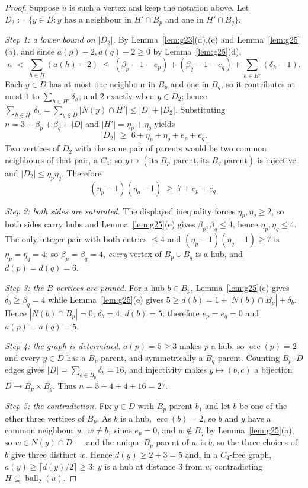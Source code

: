 \documentclass[11pt]{article}
\theoremstyle{plain}
\theoremstyle{definition}
\theoremstyle{remark}
\numberwithin{equation}{section}
\newcommand{\ecc}{\operatorname{ecc}}
\newcommand{\ball}{\operatorname{ball}}
\begin{document}
\begin{proof}
Suppose $u$ is such a vertex and keep the notation above. Let
$D_2 := \{y \in D : y$ has a neighbour in $H'\cap B_p$ and one in $H'\cap B_q\}$.

\emph{Step 1: a lower bound on $|D_2|$.} By Lemma~\ref{lem:g23}(d),(e) and
Lemma~\ref{lem:g25}(b), and since $a(p)-2, a(q)-2 \ge 0$ by Lemma~\ref{lem:g25}(d),
\[
 n \;<\; \sum_{h\in H}(a(h)-2)
   \;\le\; (\beta_p - 1 - e_p) + (\beta_q - 1 - e_q) + \sum_{h \in H'} (\delta_h - 1).
\]
Each $y \in D$ has at most one neighbour in $B_p$ and one in $B_q$, so it contributes at most
$1$ to $\sum_{h\in H'}\delta_h$, and $2$ exactly when $y \in D_2$; hence
$\sum_{h\in H'}\delta_h = \sum_{y\in D}|N(y)\cap H'| \le |D| + |D_2|$. Substituting
$n = 3+\beta_p+\beta_q+|D|$ and $|H'| = \eta_p + \eta_q$ yields
\[
  |D_2| \;\ge\; 6 + \eta_p + \eta_q + e_p + e_q .
\]
Two vertices of $D_2$ with the same pair of parents would be two common neighbours of that
pair, a $C_4$; so $y \mapsto (\text{its }B_p\text{-parent}, \text{its }B_q\text{-parent})$ is
injective and $|D_2| \le \eta_p\eta_q$. Therefore
\[
  (\eta_p - 1)(\eta_q - 1) \;\ge\; 7 + e_p + e_q .
\]

\emph{Step 2: both sides are saturated.} The displayed inequality forces
$\eta_p, \eta_q \ge 2$, so both sides carry hubs and Lemma~\ref{lem:g25}(e) gives
$\beta_p,\beta_q \le 4$, hence $\eta_p,\eta_q \le 4$. The only integer pair with both entries
$\le 4$ and $(\eta_p-1)(\eta_q-1)\ge 7$ is $\eta_p = \eta_q = 4$; so $\beta_p = \beta_q = 4$,
\emph{every} vertex of $B_p\cup B_q$ is a hub, and $d(p) = d(q) = 6$.

\emph{Step 3: the $B$-vertices are pinned.} For a hub $b \in B_p$, Lemma~\ref{lem:g25}(c)
gives $\delta_b \ge \beta_q = 4$ while Lemma~\ref{lem:g25}(e) gives
$5 \ge d(b) = 1 + |N(b)\cap B_p| + \delta_b$. Hence $|N(b)\cap B_p| = 0$, $\delta_b = 4$,
$d(b) = 5$; therefore $e_p = e_q = 0$ and $a(p) = a(q) = 5$.

\emph{Step 4: the graph is determined.} $a(p) = 5 \ge 3$ makes $p$ a hub, so $\ecc(p) = 2$
and every $y \in D$ has a $B_p$-parent, and symmetrically a $B_q$-parent. Counting
$B_p$--$D$ edges gives $|D| = \sum_{b\in B_p}\delta_b = 16$, and injectivity makes
$y \mapsto (b,c)$ a bijection $D \to B_p\times B_q$. Thus $n = 3+4+4+16 = 27$.

\emph{Step 5: the contradiction.} Fix $y \in D$ with $B_p$-parent $b_1$ and let $b$ be one of
the other three vertices of $B_p$. As $b$ is a hub, $\ecc(b) = 2$, so $b$ and $y$ have a
common neighbour $w$; $w \ne b_1$ since $e_p = 0$, and $w \notin B_q$ by
Lemma~\ref{lem:g25}(a), so $w \in N(y)\cap D$ --- and the unique $B_p$-parent of $w$ is $b$,
so the three choices of $b$ give three distinct $w$. Hence $d(y) \ge 2+3 = 5$ and, in a
$C_4$-free graph, $a(y)\ge \lceil d(y)/2\rceil \ge 3$: $y$ is a hub at distance $3$ from
$u$, contradicting $H \subseteq \ball_2(u)$.
\end{proof}
\end{document}

